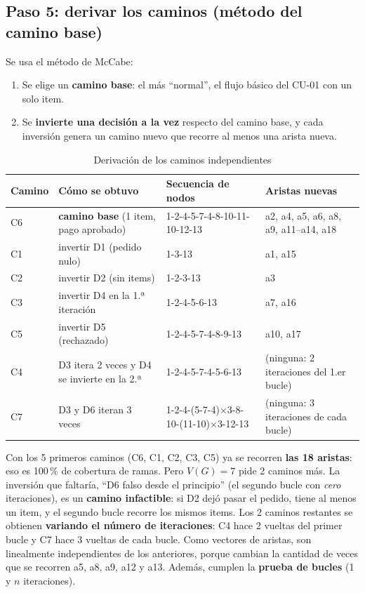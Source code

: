 \documentclass[11pt,a4paper,oneside]{report}
\begin{document}
\subsection{Paso 5: derivar los caminos (método del camino base)}
Se usa el método de McCabe:
\begin{enumerate}
  \item Se elige un \textbf{camino base}: el más ``normal'', el flujo básico del CU-01 con un solo item.
  \item Se \textbf{invierte una decisión a la vez} respecto del camino base, y cada inversión genera un camino nuevo que recorre al menos una arista nueva.
\end{enumerate}

\begin{table}[H]
\centering
\caption{Derivación de los caminos independientes}
\scriptsize
\begin{tabularx}{\linewidth}{llXl}
\toprule
\textbf{Camino} & \textbf{Cómo se obtuvo} & \textbf{Secuencia de nodos} & \textbf{Aristas nuevas}\\
\midrule
C6 & \textbf{camino base} (1 item, pago aprobado) & 1-2-4-5-7-4-8-10-11-10-12-13 & a2, a4, a5, a6, a8, a9, a11--a14, a18\\
C1 & invertir D1 (pedido nulo) & 1-3-13 & a1, a15\\
C2 & invertir D2 (sin items) & 1-2-3-13 & a3\\
C3 & invertir D4 en la 1.ª iteración & 1-2-4-5-6-13 & a7, a16\\
C5 & invertir D5 (rechazado) & 1-2-4-5-7-4-8-9-13 & a10, a17\\
C4 & D3 itera 2 veces y D4 se invierte en la 2.ª & 1-2-4-5-7-4-5-6-13 & (ninguna: 2 iteraciones del 1.er bucle)\\
C7 & D3 y D6 iteran 3 veces & 1-2-4-(5-7-4)$\times$3-8-10-(11-10)$\times$3-12-13 & (ninguna: 3 iteraciones de cada bucle)\\
\bottomrule
\end{tabularx}
\end{table}

\begin{atencion}
Con los 5 primeros caminos (C6, C1, C2, C3, C5) ya se recorren \textbf{las 18 aristas}: eso es 100\,\% de cobertura de ramas. Pero $V(G) = 7$ pide 2 caminos más. La inversión que faltaría, ``D6 falso desde el principio'' (el segundo bucle con \emph{cero} iteraciones), es un \textbf{camino infactible}: si D2 dejó pasar el pedido, tiene al menos un item, y el segundo bucle recorre los mismos items. Los 2 caminos restantes se obtienen \textbf{variando el número de iteraciones}: C4 hace 2 vueltas del primer bucle y C7 hace 3 vueltas de cada bucle. Como vectores de aristas, son linealmente independientes de los anteriores, porque cambian la cantidad de veces que se recorren a5, a8, a9, a12 y a13. Además, cumplen la \textbf{prueba de bucles} (1 y $n$ iteraciones).
\end{atencion}
\end{document}
